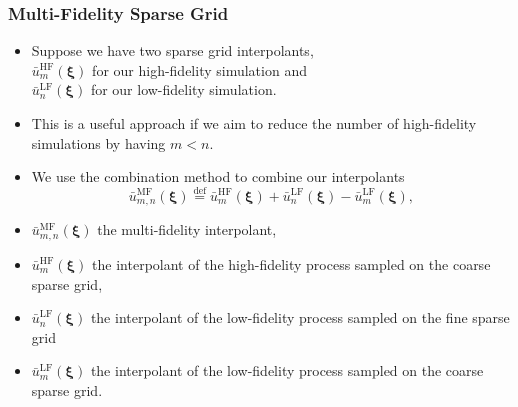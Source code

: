 \documentclass[11pt,ucs]{beamer}
\begin{document}
\begin{frame}\frametitle{Multi-Fidelity Sparse Grid}

\begin{itemize}
\item Suppose we have two sparse grid interpolants,\\
$\bar u_m^\text{HF}({\boldsymbol{\xi}})$ for our high-fidelity simulation and \\
$\bar u_n^\text{LF}({\boldsymbol{\xi}})$ for our low-fidelity simulation. 

\item This is a useful approach if we aim to reduce the number of high-fidelity simulations by having $m<n$. 

\item We use the combination method  to combine our interpolants
%
\begin{equation*}
\bar u_{m,n}^\text{MF}(\boldsymbol{\xi})  \overset{\text{def}}{=} \bar u_m^\text{HF}(\boldsymbol{\xi})  + \bar u_n^\text{LF}(\boldsymbol{\xi})  - \bar u_m^\text{LF}(\boldsymbol{\xi}) ,
\end{equation*}



\item $\bar u_{m,n}^\text{MF}(\boldsymbol{\xi})$ the multi-fidelity interpolant, 

\item $\bar u_m^\text{HF}(\boldsymbol{\xi})$ the interpolant of the high-fidelity process sampled on the coarse sparse grid, 

\item $\bar u_n^\text{LF}(\boldsymbol{\xi})$ the interpolant of the low-fidelity process sampled on the fine sparse grid 

\item $\bar u_m^\text{LF}(\boldsymbol{\xi})$ the interpolant of the low-fidelity process sampled on the coarse sparse grid. 


\end{itemize}

\end{frame}
\end{document}
